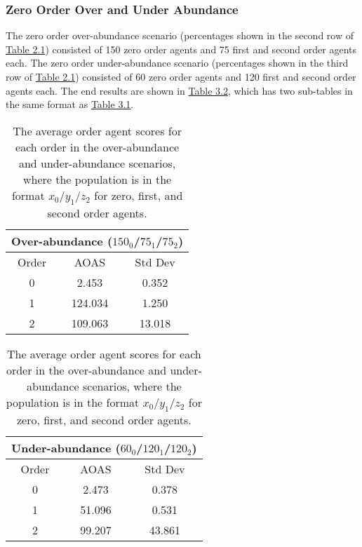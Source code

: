 \subsubsection{Zero Order Over and Under Abundance}

The zero order over-abundance scenario (percentages shown in the second row of \hyperref[tab:reg-population-table]{Table 2.1}) consisted of 150 zero order agents and 75 first and second order agents each. The zero order under-abundance scenario (percentages shown in the third row of \hyperref[tab:reg-population-table]{Table 2.1}) consisted of 60 zero order agents and 120 first and second order agents each. The end results are shown in \hyperref[table:non-sig-zero-order-simple]{Table 3.2}, which has two sub-tables in the same format as \hyperref[table:non-sig-default-equal-simple]{Table 3.1}.

\begin{table}[h]
\centering
\begin{tabular}{|c|c|c|}
\hline
\multicolumn{3}{|c|}{Over-abundance ($150_{0}$/$75_{1}$/$75_{2}$)} \\
\hline
Order & AOAS & Std Dev \\
\hline
0     & 2.453   & 0.352   \\
1     & 124.034 & 1.250   \\
2     & 109.063 & 13.018  \\
\hline
\end{tabular}
\qquad
\begin{tabular}{|c|c|c|}
\hline
\multicolumn{3}{|c|}{Under-abundance ($60_{0}$/$120_{1}$/$120_{2}$)} \\
\hline
Order & AOAS & Std Dev \\
\hline
0     & 2.473   & 0.378   \\
1     & 51.096  & 0.531   \\
2     & 99.207  & 43.861  \\
\hline
\end{tabular}
\caption{The average order agent scores for each order in the over-abundance and under-abundance scenarios, where the population is in the format $x_{0}$/$y_{1}$/$z_{2}$ for zero, first, and second order agents.}
\label{table:non-sig-zero-order-simple}
\end{table}

